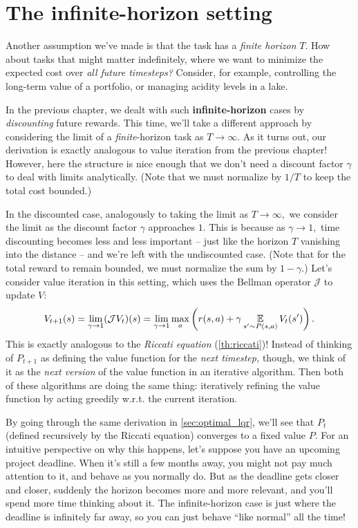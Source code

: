 \documentclass[../main/main]{subfiles}
\begin{document}
\section{The infinite-horizon setting}

Another assumption we've made is that the task has a \emph{finite horizon} $T$. How about tasks that might matter indefinitely, where we want to minimize the expected cost over \emph{all future timesteps?} Consider, for example, controlling the long-term value of a portfolio, or managing acidity levels in a lake.

In the previous chapter, we dealt with such \textbf{infinite-horizon} cases by \emph{discounting} future rewards. This time, we'll take a different approach by considering the limit of a \emph{finite}-horizon task as $T \to \infty$.
As it turns out, our derivation is exactly analogous to value iteration from the previous chapter! However, here the structure is nice enough that we don't need a discount factor $\gamma$ to deal with limits analytically. (Note that we must normalize by $1/T$ to keep the total cost bounded.)

In the discounted case, analogously to taking the limit as $T \to \infty,$ we consider the limit as the discount factor $\gamma$ approaches $1.$ This is because as $\gamma \to 1,$ time discounting becomes less and less important -- just like the horizon $T$ vanishing into the distance -- and we're left with the undiscounted case. (Note that for the total reward to remain bounded, we must normalize the sum by $1 - \gamma.$) Let's consider value iteration in this setting, which uses the Bellman operator $\mathcal{J}$ to update $V$: \[
    V_{t+1}(s) = \lim_{\gamma \to 1} (\mathcal{J} V_t)(s) = \lim_{\gamma \to 1} \max_a \left( r(s, a) + \gamma \operatorname*{\mathbb{E}}_{s' \sim P(s, a)} V_t(s') \right).
\]
This is exactly analogous to the \emph{Riccati equation} (\ref{th:riccati})!
Instead of thinking of $P_{t+1}$ as defining the value function for the \emph{next timestep,} though, we think of it as the \emph{next version} of the value function in an iterative algorithm.
Then both of these algorithms are doing the same thing:
iteratively refining the value function by acting greedily w.r.t. the current iteration.

By going through the same derivation in \autoref{sec:optimal_lqr}, we'll see that $P_t$ (defined recursively by the Riccati equation) converges to a fixed value $P$.
For an intuitive perspective on why this happens, let's suppose you have an upcoming project deadline. When it's still a few months away, you might not pay
much attention to it, and behave as you normally do. But as the deadline gets closer and closer, suddenly the
horizon becomes more and more relevant, and you'll spend more time thinking about it.
The infinite-horizon case is just where the deadline is infinitely far away, so you can just behave ``like normal'' all the time!
\end{document}
